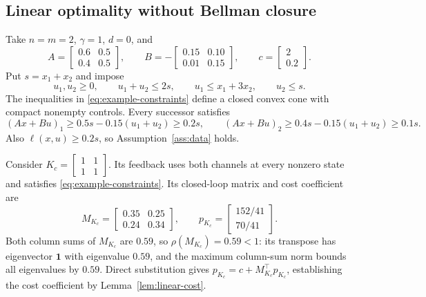 \documentclass[10pt]{article}
\newcommand{\one}{\mathbf 1}
\begin{document}
\subsection{Linear optimality without Bellman closure}

Take $n=m=2$, $\gamma=1$, $d=0$, and
\begin{equation}
 A=\begin{bmatrix}0.6&0.5\\0.4&0.5\end{bmatrix},\qquad
 B=-\begin{bmatrix}0.15&0.10\\0.01&0.15\end{bmatrix},\qquad
 c=\begin{bmatrix}2\\0.2\end{bmatrix}.
 \label{eq:example-data}
\end{equation}
Put $s=x_1+x_2$ and impose
\begin{equation}
 u_1,u_2\ge0,\qquad
 u_1+u_2\le2s,\qquad
 u_1\le x_1+3x_2,\qquad u_2\le s.
 \label{eq:example-constraints}
\end{equation}
The inequalities in \eqref{eq:example-constraints} define a closed convex cone with compact nonempty controls. Every successor satisfies
\[
 (Ax+Bu)_1\ge0.5s-0.15(u_1+u_2)\ge0.2s,\qquad
 (Ax+Bu)_2\ge0.4s-0.15(u_1+u_2)\ge0.1s.
\]
Also $\ell(x,u)\ge0.2s$, so Assumption~\ref{ass:data} holds.

Consider $K_c=\begin{bmatrix}1&1\\1&1\end{bmatrix}$. Its feedback uses both channels at every nonzero state and satisfies \eqref{eq:example-constraints}. Its closed-loop matrix and cost coefficient are
\begin{equation}
 M_{K_c}=\begin{bmatrix}0.35&0.25\\0.24&0.34\end{bmatrix},\qquad
 p_{K_c}=\begin{bmatrix}152/41\\70/41\end{bmatrix}.
 \label{eq:example-policy}
\end{equation}
Both column sums of $M_{K_c}$ are $0.59$, so $\rho(M_{K_c})=0.59<1$: its transpose has eigenvector $\one$ with eigenvalue $0.59$, and the maximum column-sum norm bounds all eigenvalues by $0.59$. Direct substitution gives $p_{K_c}=c+M_{K_c}^\top p_{K_c}$, establishing the cost coefficient by Lemma~\ref{lem:linear-cost}.
\end{document}

